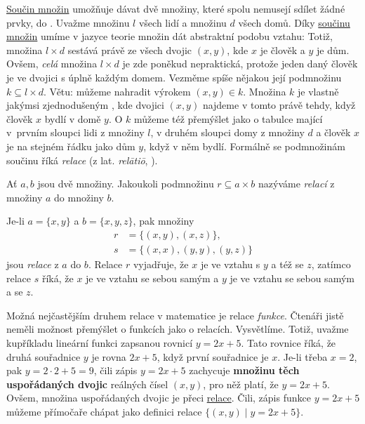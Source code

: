\hyperref[def:soucin-mnozin]{Součin množin} umožňuje dávat dvě množiny, které
spolu nemusejí sdílet žádné prvky, do . Uvažme množinu $l$ všech lidí
a množinu $d$ všech domů. Díky \hyperref[def:soucin-mnozin]{součinu množin}
umíme v jazyce teorie množin dát abstraktní podobu vztahu:  Totiž, množina $l \times d$ sestává právě ze všech dvojic $(x, y)$,
kde $x$ je člověk a $y$ je dům. Ovšem, \emph{celá} množina $l \times d$ je zde
poněkud nepraktická, protože jeden daný člověk je ve dvojici s úplně každým
domem. Vezměme spíše nějakou její podmnožinu $k \subseteq l \times d$. Větu:
 můžeme nahradit výrokem $(x, y) \in k$.
Množina $k$ je vlastně jakýmsi zjednodušeným , kde dvojici $(x,
y)$ najdeme v tomto  právě tehdy, když člověk $x$ bydlí v domě $y$.
O $k$ můžeme též přemýšlet jako o tabulce mající v~prvním sloupci lidi z množiny
$l$, v druhém sloupci domy z množiny $d$ a člověk $x$ je na stejném řádku jako
dům $y$, když v něm bydlí. Formálně se podmnožinám součinu říká
\emph{relace} (z lat. \emph{relātiō}, ).
\begin{definition}[Relace]
  \label{def:relace}
  Ať $a, b$ jsou dvě množiny. Jakoukoli podmnožinu $r \subseteq a \times b$
  nazýváme \emph{relací} z množiny $a$ do množiny $b$.
\end{definition}
\begin{example}
  \label{exam:relace}
  Je-li $a = \{x, y\}$ a $b = \{x, y, z\}$, pak množiny
  \begin{align*}
    r &= \{(x, y), (x, z)\},\\
    s &= \{(x, x), (y, y), (y, z)\}
  \end{align*}
  jsou \emph{relace} z $a$ do $b$. Relace $r$ vyjadřuje, že $x$ je ve vztahu s
  $y$ a též se $z$, zatímco relace $s$ říká, že $x$ je ve vztahu se sebou samým
  a $y$ je ve vztahu se sebou samým a se $z$.
\end{example}

Možná nejčastějším druhem relace v matematice je relace \emph{funkce}. Čtenáři
jistě neměli možnost přemýšlet o funkcích jako o relacích. Vysvětlíme. Totiž,
uvažme kupříkladu lineární funkci zapsanou rovnicí $y = 2x + 5$. Tato rovnice
říká, že druhá souřadnice $y$ je rovna $2x + 5$, když první souřadnice je $x$.
Je-li třeba $x = 2$, pak $y = 2 \cdot 2 + 5 = 9$, čili zápis $y = 2x + 5$
zachycuje \textbf{množinu těch uspořádaných dvojic} reálných čísel $(x, y)$,
pro něž platí, že $y = 2x + 5$. Ovšem, množina uspořádaných dvojic je přeci
\hyperref[def:relace]{relace}. Čili, zápis funkce $y = 2x + 5$ můžeme přímočaře
chápat jako definici relace $\{(x, y) \mid y = 2x + 5\}$.

